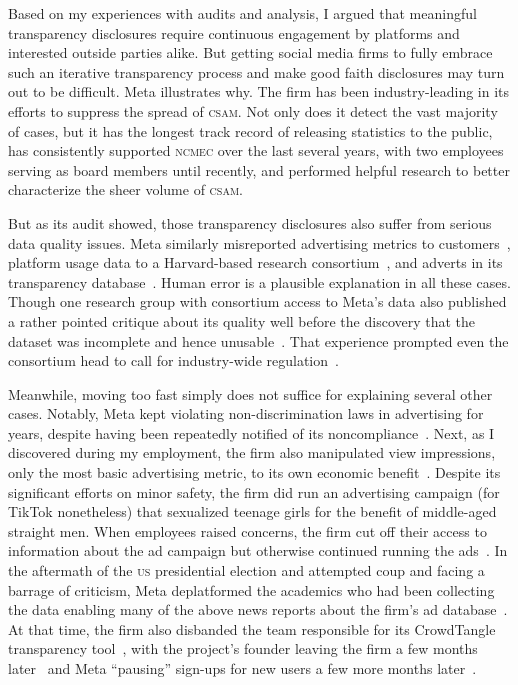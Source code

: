 \documentclass[nonacm,screen]{acmart}
\newcommand\V[1]{\textsc{\MakeLowercase{#1}}}
\begin{document}
Based on my experiences with audits and analysis, I argued that meaningful
transparency disclosures require continuous engagement by platforms and
interested outside parties alike. But getting social media firms to fully
embrace such an iterative transparency process and make good faith disclosures
may turn out to be difficult. Meta illustrates why. The firm has been
industry-leading in its efforts to suppress the spread of \V{CSAM}. Not only
does it detect the vast majority of cases, but it has the longest track record
of releasing statistics to the public, has consistently supported \V{NCMEC} over
the last several years, with two employees serving as board members until
recently, and performed helpful research to better characterize the sheer volume
of \V{CSAM}.

But as its audit showed, those transparency disclosures also suffer from serious
data quality issues. Meta similarly misreported advertising metrics to
customers~\cite{BruellPatel2020,Hutchinson2016,Hutchinson2016b,Hutchinson2017,
VranicaMarshall2016}, platform usage data to a Harvard-based research
consortium~\cite{Timberg2021}, and adverts in its transparency
database~\cite{Rosenberg2019,ScottMontellaro2021,SilvermanMac2020a}. Human error
is a plausible explanation in all these cases. Though one research group with
consortium access to Meta's data also published a rather pointed critique about
its quality well before the discovery that the dataset was incomplete and hence
unusable~\cite{Hegelich2020,HegelichMarcoea2020}. That experience prompted even
the consortium head to call for industry-wide
regulation~\cite{PersilyTucker2021}.

Meanwhile, moving too fast simply does not suffice for explaining several other
cases. Notably, Meta kept violating non-discrimination laws in advertising for
years, despite having been repeatedly notified of its
noncompliance~\cite{AngwinParrisJr2016,AngwinScheiberea2017,AngwinTobinea2017,
KofmanTobin2019,Kofman2022,Merrill2020,TobinMerrill2018}. Next, as I discovered
during my employment, the firm also manipulated view impressions, only the most
basic advertising metric, to its own economic benefit~\cite{Grimm2022c}. Despite
its significant efforts on minor safety, the firm did run an advertising
campaign (for TikTok nonetheless) that sexualized teenage girls for the benefit
of middle-aged straight men. When employees raised concerns, the firm cut off
their access to information about the ad campaign but otherwise continued
running the ads~\cite{SilvermanMac2020}. In the aftermath of the \V{US}
presidential election and attempted coup and facing a barrage of criticism, Meta
deplatformed the academics who had been collecting the data enabling many of the
above news reports about the firm's ad database~\cite{EdelsonMcCoy2021,
EdelsonMcCoy2021a}. At that time, the firm also disbanded the team responsible
for its CrowdTangle transparency tool~\cite{Roose2021a}, with the project's
founder leaving the firm a few months later~\cite{Heath2021} and Meta
``pausing'' sign-ups for new users a few more months
later~\cite{PatelCulliford2022}.
\end{document}
